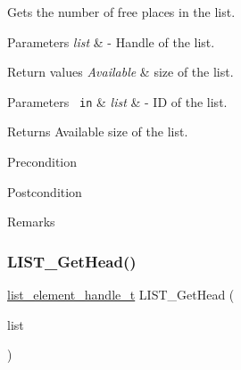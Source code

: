 Gets the number of free places in the list. 


\begin{DoxyParams}{Parameters}
{\em list} & -\/ Handle of the list.\\
\hline
\end{DoxyParams}

\begin{DoxyRetVals}{Return values}
{\em Available} & size of the list.\\
\hline
\end{DoxyRetVals}


 
\begin{DoxyParams}[1]{Parameters}
\mbox{\texttt{ in}}  & {\em list} & -\/ ID of the list.\\
\hline
\end{DoxyParams}
\begin{DoxyReturn}{Returns}
Available size of the list.
\end{DoxyReturn}
\begin{DoxyPrecond}{Precondition}

\end{DoxyPrecond}
\begin{DoxyPostcond}{Postcondition}

\end{DoxyPostcond}
\begin{DoxyRemark}{Remarks}
\begin{DoxyVerb}\end{DoxyVerb}
 
\end{DoxyRemark}
\mbox{\label{group___generic_list_ga33117981034d1af2c97fe60d1ca26629}} 
\subsubsection{\texorpdfstring{LIST\_GetHead()}{LIST\_GetHead()}}
{\footnotesize\ttfamily \mbox{\hyperlink{structlist__element__tag}{list\+\_\+element\+\_\+handle\+\_\+t}} L\+I\+S\+T\+\_\+\+Get\+Head (\begin{DoxyParamCaption}\item[{\mbox{\hyperlink{structlist__label}{list\+\_\+handle\+\_\+t}}}]{list }\end{DoxyParamCaption})}



